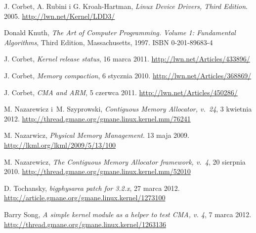 

\begin{thebibliography}{99}

  J. Corbet, A. Rubini i G. Kroah-Hartman,
  \emph{Linux Device Drivers, Third Edition}.
  2005.
  \url{http://lwn.net/Kernel/LDD3/}

  Donald Knuth,
  \emph{The Art of Computer Programming. Volume 1: Fundamental
    Algorithms},
  Third Edition,
  Massachusetts, 1997.
  ISBN 0-201-89683-4

  J. Corbet,
  \emph{Kernel release status},
  16 marca 2011.
  \url{http://lwn.net/Articles/433896/}

  J. Corbet,
  \emph{Memory compaction},
  6 stycznia 2010.
  \url{http://lwn.net/Articles/368869/}

  J. Corbet,
  \emph{CMA and ARM},
  5 czerwca 2011.
  \url{http://lwn.net/Articles/450286/}

  M. Nazarewicz i~M. Szyprowski,
  \emph{Contiguous Memory Allocator, v.\ 24},
  3 kwietnia 2012.
  \url{http://thread.gmane.org/gmane.linux.kernel.mm/76241}

  M. Nazarwicz,
  \emph{Physical Memory Management}.
  13 maja 2009.
  \url{http://lkml.org/lkml/2009/5/13/100}

  M. Nazarewicz,
  \emph{The Contiguous Memory Allocator framework, v.\ 4},
  20 sierpnia 2010.
  \url{http://thread.gmane.org/gmane.linux.kernel.mm/52010}

  D. Tochansky,
  \emph{bigphysarea patch for 3.2.x},
  27 marca 2012.
  \url{http://article.gmane.org/gmane.linux.kernel/1273100}

  Barry Song,
  \emph{A simple kernel module as a helper to test CMA, v. 4},
  7 marca 2012.
  \url{http://thread.gmane.org/gmane.linux.kernel/1263136}


\end{thebibliography}
